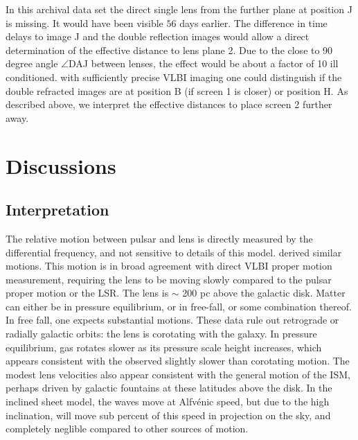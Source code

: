 \documentclass[useAMS,usenatbib]{mn2e}
\begin{document}

In this archival data set the direct single lens from the further
plane at position J is missing.  It would have been visible $56$ days
earlier. The difference in time delays to image J and the double
reflection images would allow a direct determination of the effective
distance to lens plane 2.  Due to the close to 90 degree angle $\angle$DAJ
between lenses, the effect would be about a factor of 10 ill
conditioned.  with sufficiently precise VLBI imaging one could
distinguish if the double refracted images are at position B (if
screen 1 is closer) or position H.  As described above, we interpret
the effective distances to place screen 2 further away.

\section{Discussions}

\subsection{Interpretation}

The relative motion between pulsar and lens is directly measured by
the differential frequency, and not sensitive to details of this
model.  \citet{2010ApJ...708..232B} derived similar motions.  This
motion is in broad agreement with direct VLBI proper motion
measurement, requiring the lens to be moving slowly compared to the
pulsar proper motion or the LSR.  The lens is $\sim$ 200 pc above the
galactic disk.  Matter can either be in pressure equilibrium, or in
free-fall, or some combination thereof.  In free fall, one expects
substantial motions.  These data rule out retrograde or radially
galactic orbits: the lens is corotating with the galaxy.  In pressure
equilibrium, gas rotates slower as its pressure scale height
increases, which appears consistent with the observed slightly slower
than corotating motion.  The modest lens velocities also appear
consistent with the general motion of the ISM, perhaps driven by
galactic fountains\citep{1976ApJ...205..762S} at these latitudes above
the disk.  In the inclined sheet model, the waves move at Alfv\'enic
speed, but due to the high inclination, will move sub percent of this
speed in projection on the sky, and completely neglible compared to
other sources of motion.
\end{document}
